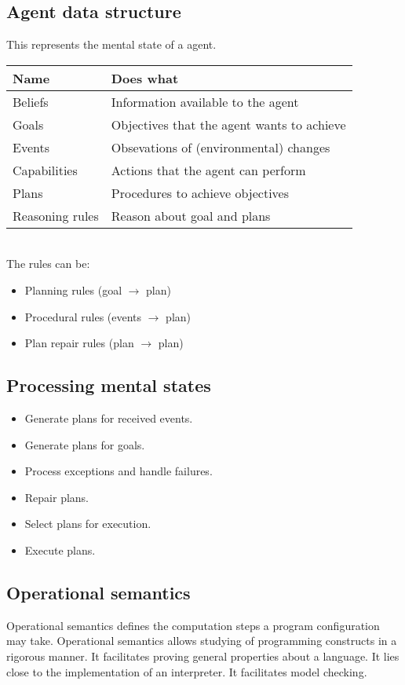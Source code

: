 \documentclass{article}
\begin{document}
\subsection{Agent data structure}
This represents the mental state of a agent. \\
\begin{tabular}{ll}
	Name & Does what \\ \toprule
	Beliefs & Information available to the agent \\
	Goals & Objectives that the agent wants to achieve \\
	Events & Obsevations of (environmental) changes \\
	Capabilities & Actions that the agent can perform \\
	Plans & Procedures to achieve objectives \\
	Reasoning rules & Reason about goal and plans \\
\end{tabular} \\

\noindent
The rules can be:

\begin{itemize}
	\item Planning rules (goal $\to$ plan)
	\item Procedural rules (events $\to$ plan)
	\item Plan repair rules (plan $\to$ plan)
\end{itemize}

\subsection{Processing mental states}

\begin{itemize}
	\item Generate plans for received events.
	\item Generate plans for goals.
	\item Process exceptions and handle failures.
	\item Repair plans.
	\item Select plans for execution.
	\item Execute plans.
\end{itemize}

\subsection{Operational semantics}
Operational semantics defines the computation steps a program
configuration may take. Operational semantics allows studying
of programming constructs in a rigorous manner. It facilitates proving
general properties about a language. It lies close to the implementation
of an interpreter. It facilitates model checking.
\end{document}
